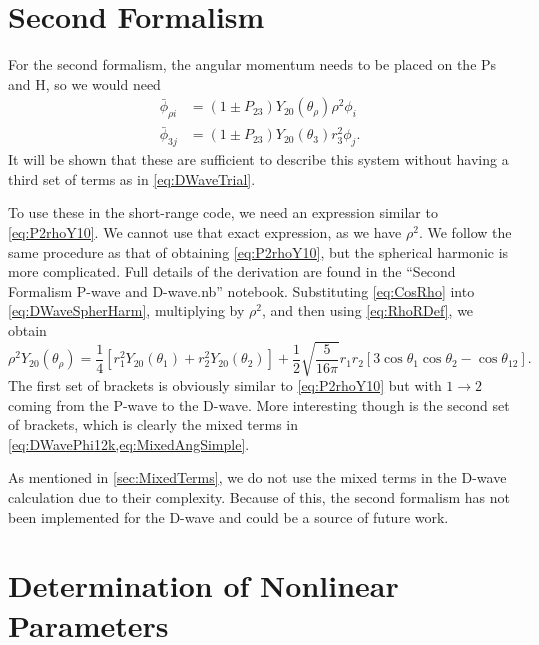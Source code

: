 \documentclass[Dissertation.tex]{subfiles}
\begin{document}
\section{Second Formalism}
\label{sec:DSecondForm}
For the second formalism, the angular momentum needs to be placed on the Ps and
H, so we would need
\begin{subequations}
\label{eq:DWave2ndPhiBar}
\begin{align}
\bar{\phi}_{\rho i} &= \left(1 \pm P_{23}\right) Y_{20}(\theta_\rho) \rho^2 \phi_i \label{eq:DWave2ndPhi1i}\\
\bar{\phi}_{3j} &= \left(1 \pm P_{23}\right) Y_{20}(\theta_3) r_3^2 \phi_j \label{eq:DWave2ndPhi2j}.
\end{align}
\end{subequations}
It will be shown that these are sufficient to describe this system without 
having a third set of terms as in \cref{eq:DWaveTrial}.

To use these in the short-range code, we need an expression similar to
\cref{eq:P2rhoY10}. We cannot use that exact expression, as we have $\rho^2$. We
follow the same procedure as that of obtaining \cref{eq:P2rhoY10}, but the
spherical harmonic is more complicated. Full details of the derivation are
found in the ``Second Formalism P-wave and D-wave.nb'' notebook.
Substituting \cref{eq:CosRho} into \cref{eq:DWaveSpherHarm}, multiplying by
$\rho^2$, and then using \cref{eq:RhoRDef}, we obtain
\begin{equation}
\label{eq:rhoident2}
\rho^2 Y_{20}(\theta_\rho) = \frac{1}{4} \left[r_1^2 Y_{20}(\theta_1) + r_2^2 Y_{20}(\theta_2) \right] + \frac{1}{2} \sqrt{\frac{5}{16 \pi}} 
   r_1 r_2 \left[3 \cos\theta_1 \cos\theta_2 - \cos\theta_{12} \right].
\end{equation}
The first set of brackets is obviously similar to \cref{eq:P2rhoY10} but with
$1 \to 2$ coming from the P-wave to the D-wave. More interesting though is the
second set of brackets, which is clearly the mixed terms in
\cref{eq:DWavePhi12k,eq:MixedAngSimple}.

As mentioned in \cref{sec:MixedTerms}, we do not use the mixed terms in the
D-wave calculation due to their complexity. Because of this, the second
formalism has not been implemented for the D-wave and could be a source of
future work.


\section{Determination of Nonlinear Parameters}
\label{sec:DWaveNonlinear}
\end{document}
